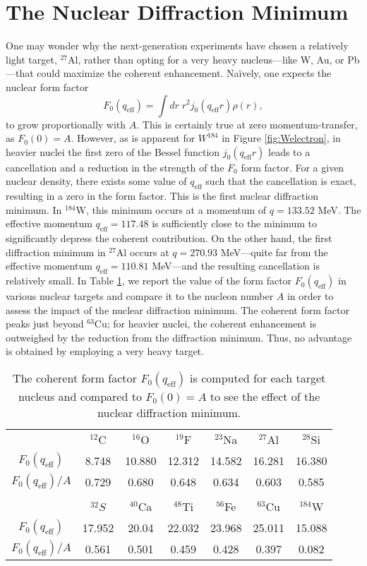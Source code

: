 \documentclass{book}[letterpaper,12pt]
\begin{document}
\section{The Nuclear Diffraction Minimum}
One may wonder why the next-generation experiments have chosen a relatively light target, $^{27}$Al, rather than opting for a very heavy nucleus---like W, Au, or Pb---that could maximize the coherent enhancement. Na\"ively, one expects the nuclear form factor
\begin{equation}
F_0(q_\mathrm{eff})=\int dr \;r^2j_0(q_\mathrm{eff}r)\rho(r),
\end{equation} 
to grow proportionally with $A$. This is certainly true at zero momentum-transfer, as $F_0(0) = A$. However, as is apparent for $W^{184}$ in Figure \ref{fig:Welectron}, in heavier nuclei the first zero of the Bessel function $j_0(q_\mathrm{eff}r)$ leads to a cancellation and a reduction in the strength of the $F_0$ form factor. For a given nuclear density, there exists some value of $q_\mathrm{eff}$ such that the cancellation is exact, resulting in a zero in the form factor. This is the first nuclear diffraction minimum. In $^{184}$W, this minimum occurs at a momentum of $q=133.52$ MeV. The effective momentum $q_\mathrm{eff}=117.48$ is sufficiently close to the minimum to significantly depress the coherent contribution. On the other hand, the first diffraction minimum in $^{27}$Al occurs at $q=270.93$ MeV---quite far from the effective momentum $q_\mathrm{eff}=110.81$ MeV---and the resulting cancellation is relatively small. In Table \ref{tab:diff_min}, we report the value of the form factor $F_0(q_\mathrm{eff})$ in various nuclear targets and compare it to the nucleon number $A$ in order to assess the impact of the nuclear diffraction minimum. The coherent form factor peaks just beyond $^{63}$Cu; for heavier nuclei, the coherent enhancement is outweighed by the reduction from the diffraction minimum. Thus, no advantage is obtained by employing a very heavy target.
\begin{table}
\centering
\begin{tabular}{ccccccc}
\hline
\hline
 & $^{12}$C & $^{16}$O & $^{19}$F & $^{23}$Na & $^{27}$Al & $^{28}$Si \\
 $F_0(q_\mathrm{eff})$ & 8.748 & 10.880 & 12.312 & 14.582 & 16.281 & 16.380 \\
$F_0(q_\mathrm{eff})/A$ & 0.729 & 0.680 & 0.648 & 0.634 & 0.603 & 0.585\\
\\
  & $^{32}S$ & $^{40}$Ca & $^{48}$Ti & $^{56}$Fe & $^{63}$Cu & $^{184}$W \\
 $F_0(q_\mathrm{eff})$ & 17.952 & 20.04 & 22.032 & 23.968 & 25.011 & 15.088\\
$F_0(q_\mathrm{eff})/A$  & 0.561 & 0.501 & 0.459 & 0.428 & 0.397 & 0.082\\
  \hline
  \hline
\end{tabular}
\caption{The coherent form factor $F_0(q_\mathrm{eff})$ is computed for each target nucleus and compared to $F_0(0)=A$ to see the effect of the nuclear diffraction minimum.}
\label{tab:diff_min}
\end{table}
\end{document}

